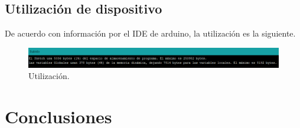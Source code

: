 \documentclass[12pt,letterpaper]{article}
\begin{document}
\newpage
\subsection{Utilización de dispositivo}
De acuerdo con información por el IDE de arduino, la utilización es la siguiente.
\begin{figure}[ht]
    \centering
    \includegraphics[width=1\textwidth]{uti.png}
    \caption{Utilización.}
\end{figure}

\section{Conclusiones}
\end{document}
